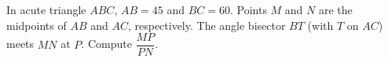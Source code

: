 In acute triangle $ABC$, $AB=45$ and $BC=60$. Points $M$ and $N$ are the midpoints of $AB$ and $AC$, respectively. The angle bisector $BT$ (with $T$ on $AC$) meets $MN$ at $P$. Compute $\dfrac{MP}{PN}$.
